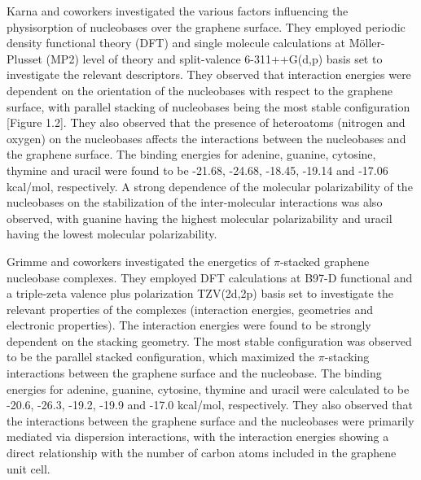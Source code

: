 Karna and coworkers investigated the various factors influencing the physisorption of nucleobases over the graphene surface.\supercite{gowtham_physisorption_2007} They employed periodic density functional theory (DFT) and single molecule calculations at M\"{o}ller-Plusset (MP2) level of theory and split-valence 6-311++G(d,p) basis set to investigate the relevant descriptors. They observed that interaction energies were dependent on the orientation of the nucleobases with respect to the graphene surface, with parallel stacking of nucleobases being the most stable configuration [Figure 1.2]. They also observed that the presence of heteroatoms (nitrogen and oxygen) on the nucleobases affects the interactions between the nucleobases and the graphene surface. The binding energies for adenine, guanine, cytosine, thymine and uracil were found to be -21.68, -24.68, -18.45, -19.14 and -17.06 kcal/mol, respectively. A strong dependence of the molecular polarizability of the nucleobases on the stabilization of the inter-molecular interactions was also observed, with guanine having the highest molecular polarizability and uracil having the lowest molecular polarizability.

Grimme and coworkers investigated the energetics of $\pi$-stacked graphene nucleobase complexes.\supercite{antony_structures_2008} They employed DFT calculations at B97-D functional and a triple-zeta valence plus polarization TZV(2d,2p) basis set to investigate the relevant properties of the complexes (interaction energies, geometries and electronic properties). The interaction energies were found to be strongly dependent on the stacking geometry. The most stable configuration was observed to be the parallel stacked configuration, which maximized the $\pi$-stacking interactions between the graphene surface and the nucleobase. The binding energies for adenine, guanine, cytosine, thymine and uracil were calculated to be -20.6, -26.3, -19.2, -19.9 and -17.0 kcal/mol, respectively. They also observed that the interactions between the graphene surface and the nucleobases were primarily mediated via dispersion interactions, with the interaction energies showing a direct relationship with the number of carbon atoms included in the graphene unit cell.

